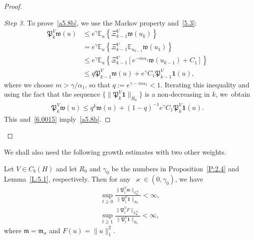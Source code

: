 \documentclass[10pt]{amsart}
\theoremstyle{definition}\newtheorem{defi}[theo]{Definition}\newtheorem{rema}[theo]{Remark}\newtheorem{exam}[theo]{Example}\newtheorem{exem}[theo]{Example}\newtheorem{nota}[theo]{Notation}
\newcommand{\mek}{{\mathbf 1}}
\newcommand{\we}{\mathfrak{w}}
\newcommand{\E}{{\mathbb E}}
\newcommand{\vk}{{\varkappa}}
\newcommand{\wwww}{{\mathfrak w}}
\newcommand{\mm}{{\mathfrak m}}
\newcommand{\PPPP}{{\mathfrak P}}
\begin{document}
\begin{proof}
\begin{proof}[Step 3]
To prove~\eqref{a5.8b}, we use the Markov property and~\eqref{5.3}:
\begin{align*}
\PPPP_{k}^V\wwww(u) &\le e^{\gamma} \E_u \left\{\Xi^V_{k-1} \wwww(u_{k}) \right\}\\&= e^{\gamma} \E_u \left\{\Xi^V_{k-1} \E_{u_{k-1}} \wwww(u_1) \right\} \\&\le e^{\gamma} \E_u \left\{\Xi^V_{k-1} [e^{-m\alpha_1 }\we(u_{k-1})+C_1] \right\} \\&\le q \PPPP_{k-1}^V\wwww(u)+ e^{\gamma} C_1 \PPPP_{k-1}^V{\mek}(u),
\end{align*}
where we choose $m > \gamma/\alpha_1 $, so that $q:=e^{\gamma-m\alpha_1}<1$. Iterating this inequality and using the fact that the sequence $\{\|\PPPP_{k}^V{\mek}\|_{R_0}\}$ is a non-decreasing in $k$, we~obtain
\begin{align*}
\PPPP_{k}^V\wwww(u) \le q^k \wwww(u)+ (1-q)^{-1}e^{\gamma} C_1 \PPPP_{k}^V{\mek}(u).
\end{align*}
This and~\eqref{6.0015} imply~\eqref{a5.8b}.
\end{proof}
\let\qed\relax
\end{proof}

We shall also need the following growth estimates with two other weights.

\begin{prop}\label{C:2.5}
Let $V\in C_b(H)$ and let $R_0$ and $\gamma_0$ be the numbers in Proposition~\ref{P:2.4} and Lemma~\ref{L:5.1}, respectively. Then for any~$\vk\in(0,\gamma_0)$, we have
\begin{align}
&\sup_{t\ge0} \frac{\|\PPPP_t^V\mm\|_{L_\mm^\infty}}{\|\PPPP_t^V{\mek}\|_{R_0}}<\infty, \label{dqdlkk}
\\
&\sup_{t\ge1} \frac{\|\PPPP_t^V F \|_{L_{\mm}^\infty}}{\|\PPPP_t^V{\mek}\|_{R_0}}<\infty, \label{estimE}
\end{align}
where $\mm=\mm_\vk$ and $F(u)= \|u\|_1^2$.
\end{prop}
\end{document}

